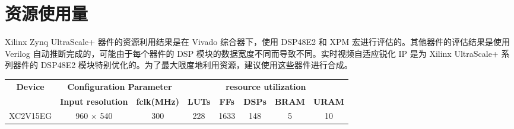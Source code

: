 \documentclass[12pt, a4paper, oneside]{ctexbook}
\begin{document}
	\section{资源使用量}	
	Xilinx Zynq UltraScale+ 器件的资源利用结果是在 Vivado 综合器下，使用 DSP48E2 和 XPM 宏进行评估的。其他器件的评估结果是使用 Verilog 自动推断完成的，可能由于每个器件的 DSP 模块的数据宽度不同而导致不同。实时视频自适应锐化 IP 是为 Xilinx UltraScale+ 系列器件的 DSP48E2 模块特别优化的。为了最大限度地利用资源，建议使用这些器件进行合成。
	\begin{table}[h]
		\centering
		\begin{tabular}{|c|cc|ccccc|}
			\hline
			\multirow{2}{*}{\textbf{Device}} & \multicolumn{2}{c|}{\textbf{Configuration Parameter}}               & \multicolumn{5}{c|}{\textbf{resource utilization}}                                                                                                               \\ \cline{2-8} 
			& \multicolumn{1}{c|}{\textbf{Input resolution}} & \textbf{fclk(MHz)} & \multicolumn{1}{c|}{\textbf{LUTs}} & \multicolumn{1}{c|}{\textbf{FFs}} & \multicolumn{1}{c|}{\textbf{DSPs}} & \multicolumn{1}{c|}{\textbf{BRAM}} & \textbf{URAM} \\ \hline
			XC2V15EG                         & \multicolumn{1}{c|}{960 × 540}                 & 300                & \multicolumn{1}{c|}{228}           & \multicolumn{1}{c|}{1633}         & \multicolumn{1}{c|}{148}           & \multicolumn{1}{c|}{5}             & 10            \\ \hline
		\end{tabular}
	\end{table}
	
\end{document}
